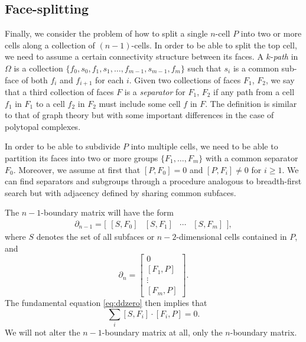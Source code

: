\documentclass[twocolumn]{article}
\begin{document}
\subsection{Face-splitting}

Finally, we consider the problem of how to split a single $n$-cell $P$ into two or more cells along a collection of $(n - 1)$-cells.
In order to be able to split the top cell, we need to assume a certain connectivity structure between its faces.
A $k$-\emph{path} in $\Omega$ is a collection $\{f_0, s_0, f_1, s_1, \ldots, f_{m - 1}, s_{m - 1}, f_m\}$ such that $s_i$ is a common sub-face of both $f_i$ and $f_{i + 1}$ for each $i$.
Given two collections of faces $F_1$, $F_2$, we say that a third collection of faces $F$ is a \emph{separator} for $F_1$, $F_2$ if any path from a cell $f_1$ in $F_1$ to a cell $f_2$ in $F_2$ must include some cell $f$ in $F$.
The definition is similar to that of graph theory but with some important differences in the case of polytopal complexes.

In order to be able to subdivide $P$ into multiple cells, we need to be able to partition its faces into two or more groups $\{F_1, \ldots, F_m\}$ with a common separator $F_0$.
Moreover, we assume at first that $[P, F_0] = 0$ and $[P, F_i] \neq 0$ for $i \ge 1$.
We can find separators and subgroups through a procedure analogous to breadth-first search but with adjacency defined by sharing common subfaces.

The $n - 1$-boundary matrix will have the form
\begin{equation}
    \partial_{n - 1} = \Big[\begin{matrix}[S, F_0] & [S, F_1] & \cdots & [S, F_m]\end{matrix}\Big],
\end{equation}
where $S$ denotes the set of all subfaces or $n - 2$-dimensional cells contained in $P$, and
\begin{equation}
    \partial_n = \left[\begin{matrix} 0 \\ [F_1, P] \\ \vdots \\ [F_m, P]\end{matrix}\right].
\end{equation}
The fundamental equation \eqref{eq:ddzero} then implies that
\begin{equation}
    \sum_i[S, F_i]\cdot[F_i, P] = 0.
    \label{eq:face-split-ddzero}
\end{equation}
We will not alter the $n - 1$-boundary matrix at all, only the $n$-boundary matrix.
\end{document}
